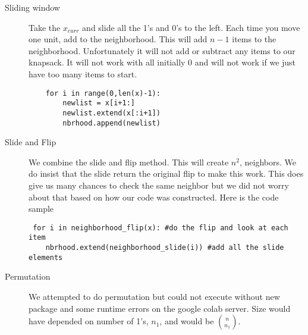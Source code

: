 \documentclass[11pt]{article}
\begin{document}
\begin{enumerate}
\begin{enumerate}
\begin{description}
\item [Sliding window]  Take the $x_{curr}$ and slide all the 1's and 0's to the left.  Each time you move one unit, add to the neighborhood.  This will add $n-1$ items to the neighborhood.  Unfortunately it will not add or subtract any items to our knapsack.  It will not work with all initially 0 and will not work if we just have too many items to start. 
\begin{verbatim}
    for i in range(0,len(x)-1):
        newlist = x[i+1:]
        newlist.extend(x[:i+1])
        nbrhood.append(newlist)

\end{verbatim}
\item [Slide and Flip]  We combine the slide and flip method.  This will create $n^2$, neighbors.  We do insist that the slide return the original flip to make this work.  This does give us many chances to check the same neighbor but we did not worry about that based on how our code was constructed.  Here is the code sample
\begin{verbatim}
 for i in neighborhood_flip(x): #do the flip and look at each item
    nbrhood.extend(neighborhood_slide(i)) #add all the slide elements
\end{verbatim}
\item [Permutation]  We attempted to do permutation but could not execute without new package and some runtime errors on the google colab server.  Size would have depended on number of 1's, $n_1$, and would be $\binom n{n_1}$. 
\end{description}


\end{enumerate}
\end{enumerate}
\end{document}
